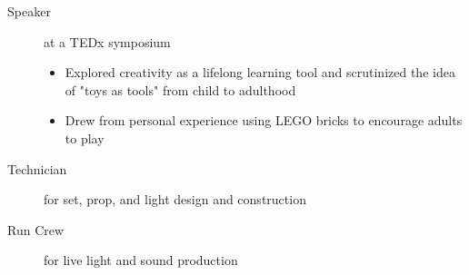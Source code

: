 \documentclass[a4paper]{deedy-resume} %
\begin{document}

    

    \begin{description}
        \item[Speaker] at a TEDx symposium
        \begin{itemize}
            \item Explored creativity as a lifelong learning tool and scrutinized the idea of "toys as tools" from child to adulthood
            \item Drew from personal experience using LEGO bricks to encourage adults to play
        \end{itemize}
    \end{description}


    

    \begin{description}
        \item[Technician] for set, prop, and light design and construction
        \item[Run Crew] for live light and sound production
    \end{description}




    
    
\end{document}
